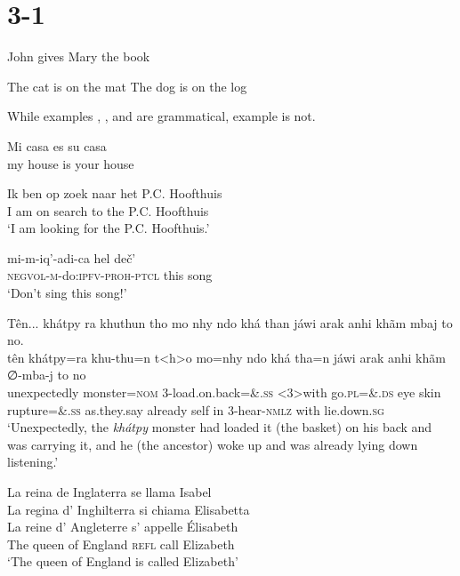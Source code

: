 \documentclass{scrartcl}
\begin{document}
\section{3-1} 

\ea\label{ex:john}
John gives Mary the book
\z

\ea\label{ex:cat}
  \ea The cat is on the mat
  \ex The dog is on the log
  \z
\z

\ea
  \z
\z

While examples , , and  are grammatical, example  is not.
 
\ea 
\gll Mi casa es su casa\\
     my house is your house\\
\z

\ea
\gll Ik ben op zoek naar het P.C. Hoofthuis\\
     I  am  on search to the P.C. Hoofthuis\\
\glt `I am looking for the P.C. Hoofthuis.'
\z

\ea
\gll mi-m-iq’-adi-ca            hel deč’\\
\textsc{negvol}-\textsc{m}-do:\textsc{ipfv}-\textsc{proh}-\textsc{ptcl} this  song  \\
\glt   ‘Don’t sing this song!’
\z

\ea
Tên... khátpy ra khuthun tho mo nhy ndo khá than jáwi arak anhi khãm mbaj to no.\\
\gll   tên           khátpy=ra   khu-thu=n  t<h>o   mo=nhy   ndo khá  tha=n              jáwi        arak    anhi khãm ∅-mba-j             to   no    \\
      unexpectedly monster=\textsc{nom} 3-load.on.back=\&.\textsc{ss} <3>with go.\textsc{pl}=\&.\textsc{ds} eye skin rupture=\&.\textsc{ss} as.they.say already self in   3-hear-\textsc{nmlz} with lie.down.\textsc{sg}\\
\glt ‘Unexpectedly, the \textit{khátpy} monster had loaded it (the basket) on his back and was carrying it, and he (the ancestor) woke up and was already lying down listening.’
\z

    
\ea
\gllll La reina de Inglaterra se llama Isabel      \\
       La regina d' Inghilterra si chiama Elisabetta\\
       La reine d' Angleterre s' appelle Élisabeth   \\
       The queen of England \textsc{refl} call Elizabeth    \\
\glt  ‘The queen of England is called Elizabeth'
\z
\end{document}
